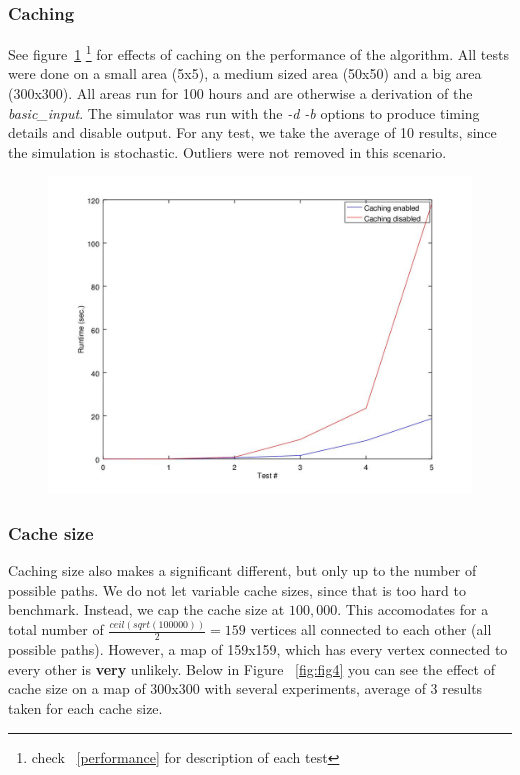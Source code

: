 \documentclass{article}
\begin{document}
	\subsubsection{Caching}
		See figure~\ref{fig:fig3} \footnote{check ~\ref{performance} for description of each test}  for effects of caching on the performance of the algorithm. All tests were done on a small area (5x5), a medium sized area (50x50)
		and a big area (300x300). All areas run for 100 hours and are otherwise a derivation of the \textit{basic\_input}. The simulator was run with the \textit{-d -b} options
		to produce timing details and disable output. For any test, we take the average of 10 results, since the simulation is stochastic. Outliers were not removed
		in this scenario.

		\begin{figure}[H]
		\centering
			\includegraphics[width=.55\columnwidth]{resources/caching_performance.jpg}
			\label{fig:fig3}
		\end{figure}

		\subsubsection{Cache size}
			Caching size also makes a significant different, but only up to the number of possible paths. We do not let variable cache sizes,
			since that is too hard to benchmark. Instead, we cap the cache size at $100,000$. This accomodates for a total number of $\frac{ceil(sqrt(100000))}{2} = 159$ vertices
			all connected to each other (all possible paths). However, a map of 159x159, which has every vertex connected to every other is \textbf{very} unlikely. Below in Figure ~\ref{fig:fig4}
			you can see the effect of cache size on a map of 300x300 with several experiments, average of 3 results taken for each cache size.
		
\end{document}
